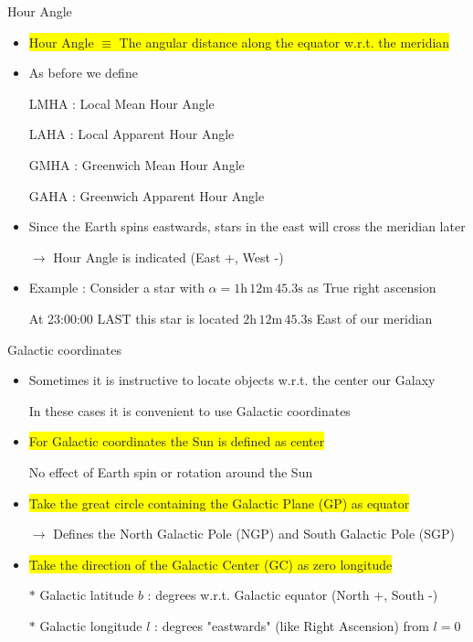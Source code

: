 \Tr
\onecolumn
\begin{center}
{\red Hour Angle}
\end{center}
%
\begin{itemize}
\item \colorbox{yellow}{Hour Angle $\equiv$ The angular distance along the equator w.r.t. the meridian}
\item As before we define
\item[] {\red LMHA : Local Mean Hour Angle}
\item[] {\red LAHA : Local Apparent Hour Angle}
\item[] {\red GMHA : Greenwich Mean Hour Angle}
\item[] {\red GAHA : Greenwich Apparent Hour Angle}
\item Since the Earth spins eastwards, stars in the east will cross the meridian later
\item[] $\rightarrow$ {\blue Hour Angle is indicated (East +, West -)}
\item Example : Consider a star with $\alpha=1\text{h}\,12\text{m}\,45.3\text{s}$ as True right ascension
\item[] At 23:00:00 LAST this star is located $2\text{h}\,12\text{m}\,45.3\text{s}$ East of our meridian
\end{itemize}

\Tr
\onecolumn
\begin{center}
{\red Galactic coordinates}
\end{center}
%
\begin{itemize}
\item Sometimes it is instructive to locate objects w.r.t. the center our Galaxy
\item[] In these cases it is convenient to use Galactic coordinates
\item \colorbox{yellow}{For Galactic coordinates the Sun is defined as center}
\item[] No effect of Earth spin or rotation around the Sun
\item \colorbox{yellow}{Take the great circle containing the Galactic Plane (GP) as equator}
\item[] $\rightarrow$ Defines the {\blue North Galactic Pole (NGP)} and {\blue South Galactic Pole (SGP)}
\item \colorbox{yellow}{Take the direction of the Galactic Center (GC) as zero longitude}
\item[$\ast$] {\blue Galactic latitude $b$} : degrees w.r.t. Galactic equator (North +, South -)
\item[$\ast$] {\blue Galactic longitude $l$} : degrees "eastwards" (like Right Ascension) from $l=0$
\end{itemize}

